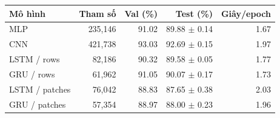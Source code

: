 \begin{tabularx}{\textwidth}{@{}Xrrrr@{}}
\toprule
Mô hình & Tham số & Val (\%) & Test (\%) & Giây/epoch \\
\midrule
MLP & 235,146 & 91.02 & 89.88 $\pm$ 0.14 & 1.67 \\
CNN & 421,738 & 93.03 & 92.69 $\pm$ 0.15 & 1.97 \\
LSTM / rows & 82,186 & 90.32 & 89.58 $\pm$ 0.05 & 1.77 \\
GRU / rows & 61,962 & 91.05 & 90.07 $\pm$ 0.17 & 1.73 \\
LSTM / patches & 76,042 & 88.83 & 87.65 $\pm$ 0.38 & 2.03 \\
GRU / patches & 57,354 & 88.97 & 88.00 $\pm$ 0.23 & 1.96 \\
\bottomrule
\end{tabularx}
